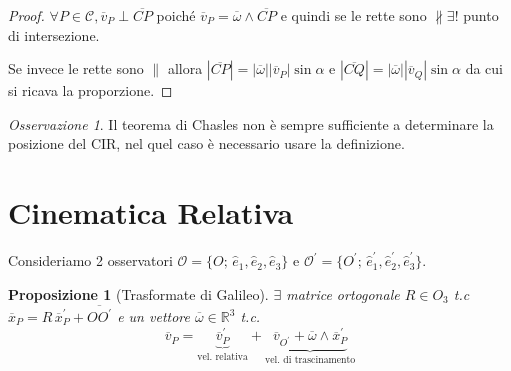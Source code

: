 \documentclass{book}
\theoremstyle{plain}
\theoremstyle{plain}
\theoremstyle{plain}
\theoremstyle{plain}
\theoremstyle{plain}
\newtheorem{prop}{Proposizione}[chapter]
\theoremstyle{definition}
\theoremstyle{remark}
\newtheorem*{oss}{Osservazione}
\theoremstyle{definition}
\begin{document}
\begin{proof}
    $\forall P \in \mathcal{C}, \overline{v}_P\perp\overline{CP}$ poiché $\overline{v}_P=\overline{\omega}\wedge\overline{CP}$ e quindi se le rette sono $\nparallel\exists!$ punto di intersezione.

    \noindent Se invece le rette sono $\parallel$ allora $|\overline{CP}|=|\overline{\omega}||\overline{v}_P|\sin{\alpha}$ e $|\overline{CQ}|=|\overline{\omega}||\overline{v}_Q|\sin{\alpha}$ da cui si ricava la proporzione.
\end{proof}

\begin{oss}
    Il teorema di Chasles non è sempre sufficiente a determinare la posizione del CIR, nel quel caso è necessario usare la definizione.
\end{oss}

\section{Cinematica Relativa}

Consideriamo 2 osservatori $\mathcal{O}=\{O;\, \hat{e}_1, \hat{e}_2, \hat{e}_3\}$ e $\mathcal{O}^{\prime}=\{O^{\prime};\, \hat{e}_1^{\prime}, \hat{e}_2^{\prime}, \hat{e}_3^{\prime}\}$.

\begin{prop}[Trasformate di Galileo]
    $\exists$ matrice ortogonale $R \in O_{3}$ t.c $\overline{x}_{P} = R\,\overline{x}_{P}^{\prime}+\overline{OO^{\prime}}$ e un vettore $\overline{\omega} \in \mathbb{R}^{3}$ t.c.
    \begin{displaymath}
        \overline{v}_{P}=\underbrace{\overline{v}_{P}^{\prime}}_{\text{vel. relativa}}+\underbrace{\overline{v}_{O^{\prime}}+\overline{\omega} \wedge \overline{x}_{P}^{\prime}}_{\text{vel. di trascinamento}}
    \end{displaymath}
\end{prop}
\end{document}

